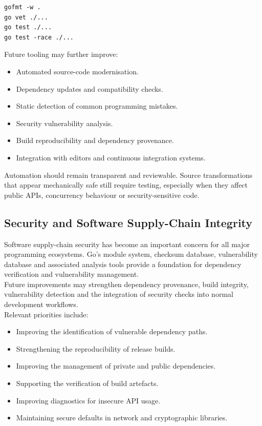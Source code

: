 \begin{lstlisting}
gofmt -w .
go vet ./...
go test ./...
go test -race ./...
\end{lstlisting}

Future tooling may further improve:

\begin{itemize}
    \item Automated source-code modernisation.
    \item Dependency updates and compatibility checks.
    \item Static detection of common programming mistakes.
    \item Security vulnerability analysis.
    \item Build reproducibility and dependency provenance.
    \item Integration with editors and continuous integration systems.
\end{itemize}

Automation should remain transparent and reviewable. Source transformations that appear mechanically safe still require testing, especially when they affect public APIs, concurrency behaviour or security-sensitive code.

\subsection{Security and Software Supply-Chain Integrity}

Software supply-chain security has become an important concern for all major programming ecosystems. Go's module system, checksum database, vulnerability database and associated analysis tools provide a foundation for dependency verification and vulnerability management.\\

Future improvements may strengthen dependency provenance, build integrity, vulnerability detection and the integration of security checks into normal development workflows.\\

Relevant priorities include:

\begin{itemize}
    \item Improving the identification of vulnerable dependency paths.
    \item Strengthening the reproducibility of release builds.
    \item Improving the management of private and public dependencies.
    \item Supporting the verification of build artefacts.
    \item Improving diagnostics for insecure API usage.
    \item Maintaining secure defaults in network and cryptographic libraries.
\end{itemize}

